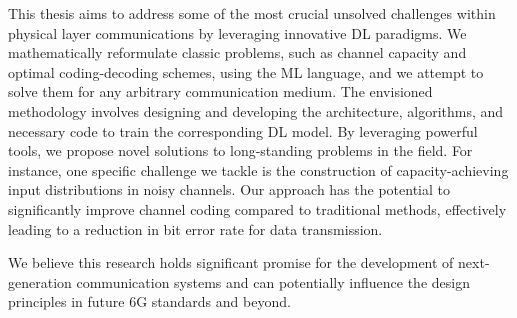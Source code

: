 This thesis aims to address some of the most crucial unsolved challenges within physical layer communications by leveraging innovative DL paradigms. We mathematically reformulate classic problems, such as channel capacity and optimal coding-decoding schemes, using the ML language, and we attempt to solve them for any arbitrary communication medium.
The envisioned methodology involves designing and developing the architecture, algorithms, and necessary code to train the corresponding DL model. By leveraging powerful tools, we propose novel solutions to long-standing problems in the field. For instance, one specific challenge we tackle is the construction of capacity-achieving input distributions in noisy channels. Our approach has the potential to significantly improve channel coding compared to traditional methods, effectively leading to a reduction in bit error rate for data transmission.

We believe this research holds significant promise for the development of next-generation communication systems and can potentially influence the design principles in future 6G standards and beyond.


